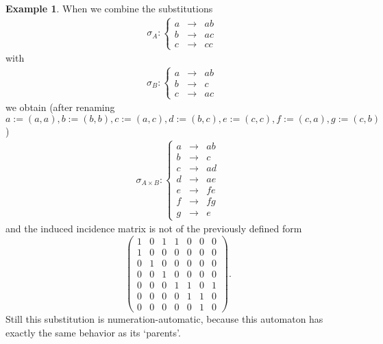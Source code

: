 \documentclass{article}
\theoremstyle{definition}
\newtheorem{example}[theorem]{Example}
\begin{document}
\begin{example} \label{ex:notclear}
When we combine the substitutions
\begin{eqnarray*}
\;\;\;
\sigma_A: \left\{ \begin{array}{lll}
a &\rightarrow& ab\\
b &\rightarrow& ac\\
c &\rightarrow& cc
\end{array} \right.
\end{eqnarray*}
with
\begin{eqnarray*}
\;\;\;
\sigma_B: \left\{ \begin{array}{lll}
a &\rightarrow& ab\\
b &\rightarrow& c\\
c &\rightarrow& ac
\end{array} \right.
\end{eqnarray*}
we obtain (after renaming $a := (a, a), b := (b, b), c := (a, c), d := (b, c), 
e := (c, c), f := (c, a), g := (c, b)$)
\begin{eqnarray*}
\sigma_{A \times B}: \left\{ \begin{array}{lll}
a &\rightarrow& ab\\
b &\rightarrow& c\\
c &\rightarrow& ad\\
d &\rightarrow& ae\\
e &\rightarrow& fe\\
f &\rightarrow& fg\\
g &\rightarrow& e
\end{array} \right.
\end{eqnarray*}
and the induced incidence matrix is not of the previously defined form
\begin{displaymath} \left( \begin{array}{ccccccc}
1 & 0 & 1 & 1 & 0 & 0 & 0 \\
1 & 0 & 0 & 0 & 0 & 0 & 0 \\
0 & 1 & 0 & 0 & 0 & 0 & 0 \\
0 & 0 & 1 & 0 & 0 & 0 & 0 \\
0 & 0 & 0 & 1 & 1 & 0 & 1 \\
0 & 0 & 0 & 0 & 1 & 1 & 0 \\
0 & 0 & 0 & 0 & 0 & 1 & 0 
\end{array} \right). \end{displaymath}
Still this substitution is numeration-automatic, because this automaton has 
exactly the same behavior as its `parents'.
\end{example}
\end{document}

